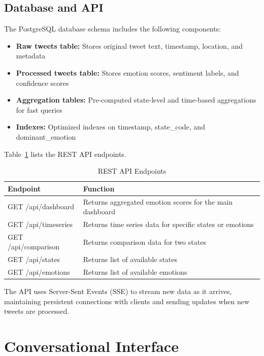 \subsection{Database and API}

The PostgreSQL database schema includes the following components:

\begin{itemize}
\item \textbf{Raw tweets table:} Stores original tweet text, timestamp, location, and metadata
\item \textbf{Processed tweets table:} Stores emotion scores, sentiment labels, and confidence scores
\item \textbf{Aggregation tables:} Pre-computed state-level and time-based aggregations for fast queries
\item \textbf{Indexes:} Optimized indexes on timestamp, state\_code, and dominant\_emotion
\end{itemize}

Table~\ref{tab:api_endpoints} lists the REST API endpoints.

\begin{table}[htbp]
\centering
\caption{REST API Endpoints}
\label{tab:api_endpoints}
\begin{tabular}{lp{8cm}}
\hline
\textbf{Endpoint} & \textbf{Function} \\
\hline
GET /api/dashboard & Returns aggregated emotion scores for the main dashboard \\
GET /api/timeseries & Returns time series data for specific states or emotions \\
GET /api/comparison & Returns comparison data for two states \\
GET /api/states & Returns list of available states \\
GET /api/emotions & Returns list of available emotions \\
\hline
\end{tabular}
\end{table}

The API uses Server-Sent Events (SSE) to stream new data as it arrives, maintaining persistent connections with clients and sending updates when new tweets are processed.


\section{Conversational Interface}

